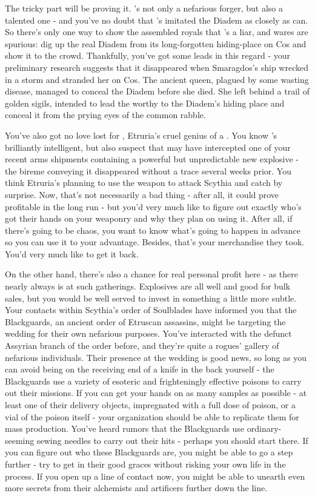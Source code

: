 \documentclass[char]{Kos}
\begin{document}
The tricky part will be proving it. \cMerchant{}'s not only a nefarious forger, but also a talented one - and you've no doubt that \cMerchant{\they}'s imitated the Diadem as closely as \cMerchant{\they} can. So there's only one way to show the assembled royals that \cMerchant{}'s a liar, and \cMerchant{\their} wares are spurious: dig up the real Diadem from its long-forgotten hiding-place on Cos and show it to the crowd. Thankfully, you've got some leads in this regard - your preliminary research suggests that it disappeared when Smaragdos's ship wrecked in a storm and stranded her on Cos. The ancient queen, plagued by some wasting disease, managed to conceal the Diadem before she died. She left behind a trail of golden sigils, intended to lead the worthy to the Diadem's hiding place and conceal it from the prying eyes of the common rabble.

You've also got no love lost for \cEtruriaKing{}, Etruria's cruel genius of a \cEtruriaKing{\monarch}. You know \cEtruriaKing{\they}'s brilliantly intelligent, but also suspect that \cEtruriaKing{\they} may have intercepted one of your recent arms shipments containing a powerful but unpredictable new explosive - the bireme conveying it disappeared without a trace several weeks prior. You think Etruria's planning to use the weapon to attack Scythia and catch \cScythiaKing{} by surprise. Now, that's not necessarily a bad thing - after all, it could prove profitable in the long run - but you'd very much like to figure out exactly who's got their hands on your weaponry and why they plan on using it. After all, if there's going to be chaos, you want to know what's going to happen in advance so you can use it to your advantage. Besides, that's your merchandise they took. You'd very much like to get it back.

On the other hand, there's also a chance for real personal profit here - as there nearly always is at such gatherings. Explosives are all well and good for bulk sales, but you would be well served to invest in something a little more subtle. Your contacts within Scythia's order of Soulblades have informed you that the Blackguards, an ancient order of Etruscan assassins, might be targeting the wedding for their own nefarious purposes. You've interacted with the defunct Assyrian branch of the order before, and they're quite a rogues' gallery of nefarious individuals. Their presence at the wedding is good news, so long as you can avoid being on the receiving end of a knife in the back yourself - the Blackguards use a variety of esoteric and frighteningly effective poisons to carry out their missions. If you can get your hands on as many samples as possible - at least one of their delivery objects, impregnated with a full dose of poison, or a vial of the poison itself - your organization should be able to replicate them for mass production. You've heard rumors that the Blackguards use ordinary-seeming sewing needles to carry out their hits - perhaps you should start there. If you can figure out who these Blackguards are, you might be able to go a step further - try to get in their good graces without risking your own life in the process. If you open up a line of contact now, you might be able to unearth even more secrets from their alchemists and artificers further down the line.
\end{document}
